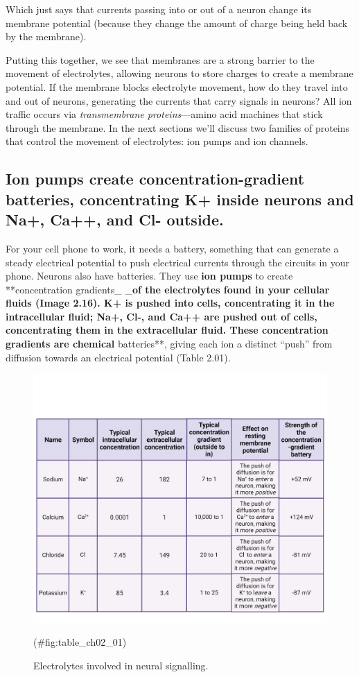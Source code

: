 \documentclass[
]{book}
\begin{document}
Which just says that currents passing into or out of a neuron change its membrane potential (because they change the amount of charge being held back by the membrane).

Putting this together, we see that membranes are a strong barrier to the movement of electrolytes, allowing neurons to store charges to create a membrane potential. If the membrane blocks electrolyte movement, how do they travel into and out of neurons, generating the currents that carry signals in neurons? All ion traffic occurs via \emph{transmembrane proteins}---amino acid machines that stick through the membrane. In the next sections we'll discuss two families of proteins that control the movement of electrolytes: ion pumps and ion channels.

\hypertarget{ion-pumps-create-concentration-gradient-batteries-concentrating-k-inside-neurons-and-na-ca-and-cl--outside.}{%
\subsection{Ion pumps create concentration-gradient batteries, concentrating K+ inside neurons and Na+, Ca++, and Cl- outside.}\label{ion-pumps-create-concentration-gradient-batteries-concentrating-k-inside-neurons-and-na-ca-and-cl--outside.}}

For your cell phone to work, it needs a battery, something that can generate a steady electrical potential to push electrical currents through the circuits in your phone. Neurons also have batteries. They use \textbf{ion pumps} to create **concentration gradients\_ \_\textbf{of the electrolytes found in your cellular fluids (Image 2.16). K+ is pushed into cells, concentrating it in the intracellular fluid; Na+, Cl-, and Ca++ are pushed out of cells, concentrating them in the extracellular fluid. These concentration gradients are chemical }batteries**, giving each ion a distinct ``push'' from diffusion towards an electrical potential (Table 2.01).

\begin{figure}

{\centering \includegraphics[width=0.8\linewidth]{images/ch02/table_02_02} 

}

\caption{Electrolytes involved in neural signalling.}(\#fig:table_ch02_01)
\end{figure}
\end{document}
